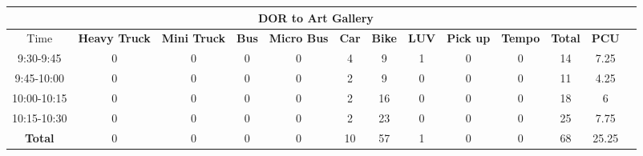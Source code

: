 \begin{landscape}
\begin{table}[h!]
\begin{tabular}{|c|c|c|c|c|c|c|c|c|c|c|c|c|}
    \hline
    \multicolumn{12}{|c|}{\textbf{DOR to Art Gallery}} \\
    \hline
        Time & \textbf{Heavy Truck} & \textbf{Mini Truck} & \textbf{Bus} & \textbf{Micro Bus} & \textbf{Car} & \textbf{Bike} & \textbf{LUV} & \textbf{Pick up} & \textbf{Tempo} & \textbf{\textbf{Total}} & \textbf{PCU} \\
    \hline
9:30-9:45	&0	&0	&0	&0	&4	&9	&1	&0	&0	&14	&7.25 \\ \hline
9:45-10:00	&0	&0	&0	&0	&2	&9	&0	&0	&0	&11	&4.25 \\ \hline
10:00-10:15	&0	&0	&0	&0	&2	&16	&0	&0	&0	&18	&6 \\ \hline
10:15-10:30	&0	&0	&0	&0	&2	&23	&0	&0	&0	&25	&7.75 \\ \hline
\textbf{Total}	&0	&0	&0	&0	&10	&57	&1	&0	&0	&68	&25.25 \\ \hline


\end{tabular}

\end{table}
\end{landscape}


